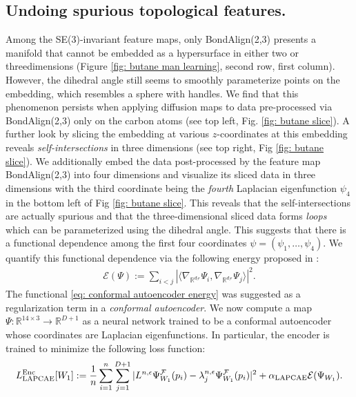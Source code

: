 \documentclass[reqno, 12pt]{article}
\begin{document}
\subsection{Undoing spurious topological features.} Among the SE(3)-invariant feature maps, only {\sf BondAlign(2,3)} presents a manifold that cannot be embedded as a hypersurface in either two or threedimensions (Figure \ref{fig: butane man learning}, second row, first column). However, the dihedral angle still seems to smoothly parameterize points on the embedding, which resembles a sphere with handles. We find that this phenomenon persists when applying diffusion maps to data pre-processed via {\sf BondAlign(2,3)} only on the carbon atoms (see top left, Fig. \ref{fig: butane slice}). A further look by slicing the embedding at various $z$-coordinates at this embedding reveals \emph{self-intersections} in three dimensions (see top right, Fig \ref{fig: butane slice}). We additionally embed the data post-processed by the feature map  {\sf BondAlign(2,3)} into four dimensions and visualize its sliced data in three dimensions with the third coordinate being the \emph{fourth} Laplacian eigenfunction $\psi_4$ in the bottom left of Fig \ref{fig: butane slice}.  This reveals that the self-intersections are actually spurious and that the three-dimensional sliced data forms \emph{loops} which can be parameterized using the dihedral angle. This suggests that there is a functional dependence among the first four coordinates $\psi = (\psi_1, \ldots, \psi_4)$. We quantify this functional dependence via the following energy proposed in \parencite{kevrekidis2024thinner}: 
\begin{align}
    \mathcal{E}(\Psi) := \sum_{i < j}|\langle \nabla_{\mathbb{R}^{d_{\mathcal{F}}}}\Psi_i, \nabla_{\mathbb{R}^{d_{\mathcal{F}}}}\Psi_j\rangle|^2. \label{eq: conformal autoencoder energy}
\end{align}
The functional \eqref{eq: conformal autoencoder energy} was suggested as a regularization term in a \emph{conformal autoencoder}. We now compute a map $\Psi: \mathbb{R}^{14 \times 3} \to \mathbb{R}^{D+1}$ as a neural network trained to be a conformal autoencoder whose coordinates are Laplacian eigenfunctions. In particular, the encoder is trained to minimize the following loss function: 
\begin{align}
    L^{\rm Enc}_{\rm LAPCAE}[W_1] := \frac{1}{n}\sum_{i=1}^{n}\sum_{j=1}^{D+1}|L^{n,\epsilon}\Psi^{\mathcal{F}}_{W_1}(p_i) - \lambda^{n,\epsilon}_{j}\Psi^{\mathcal{F}}_{W_1}(p_i)|^2 + \alpha_{\rm LAPCAE}\mathcal{E}(\Psi_{W_1}). \label{eq: LAPCAE encoder loss}
\end{align}
\end{document}
